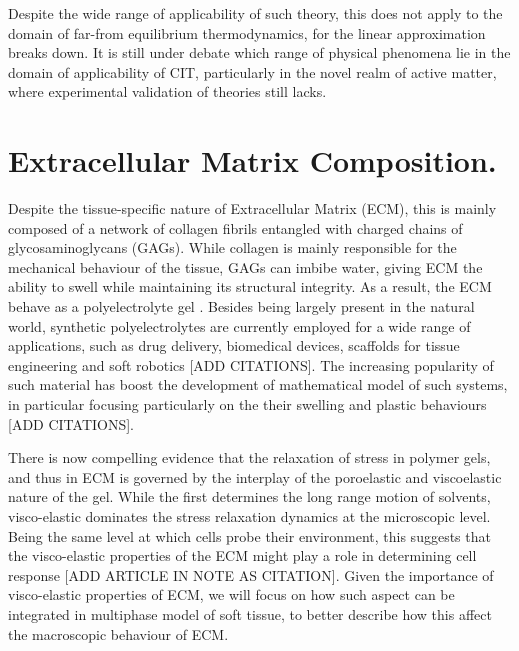 \documentclass[12pt]{extarticle}
\begin{document}
Despite the wide range of applicability of such theory, this does not apply to the domain of far-from equilibrium thermodynamics, for the linear approximation breaks down. It is still under debate which range of physical phenomena lie in the domain of applicability of CIT, particularly in the novel realm of active matter, where experimental validation of theories still lacks.
\section{Extracellular Matrix Composition.}  
Despite the tissue-specific nature of Extracellular Matrix (ECM), this is mainly composed of a network of collagen fibrils entangled with charged chains of glycosaminoglycans (GAGs). While collagen is mainly responsible for the mechanical behaviour of the tissue, GAGs can imbibe water, giving ECM the ability to swell while maintaining its structural integrity. As a result, the ECM behave as a polyelectrolyte gel \cite{ecm,ecm2}. Besides being largely present in the natural world, synthetic polyelectrolytes are currently employed for a wide range of applications, such as drug delivery, biomedical devices, scaffolds for tissue engineering and soft robotics [ADD CITATIONS]. The increasing popularity of such material has boost the development of mathematical model of such systems, in particular focusing particularly on the their swelling and plastic behaviours [ADD CITATIONS].

There is now compelling evidence that the relaxation of stress in polymer gels, and thus in ECM is governed by the interplay of the poroelastic and viscoelastic nature of the gel. While the first determines the long range motion of solvents, visco-elastic dominates the stress relaxation dynamics at the microscopic level. Being the same level at which cells probe their environment, this suggests that the visco-elastic properties of the ECM might play a role in determining cell response [ADD ARTICLE IN NOTE AS CITATION]. Given the importance of visco-elastic properties of ECM, we will focus on how such aspect can be integrated in multiphase model of soft tissue, to better describe how this affect the macroscopic behaviour of ECM. 
\end{document}
